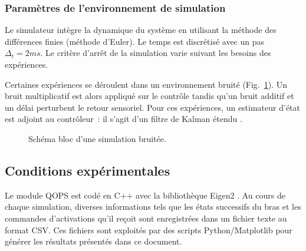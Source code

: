 \documentclass[pdftex,a4paper,11pt]{article}
\begin{document}

\subsubsection{Paramètres de l'environnement de simulation}

Le simulateur intègre la dynamique du système en utilisant la méthode des
différences finies (méthode d'Euler). Le temps est discrétisé avec un pas
$\Delta_t = 2ms$.
Le critère d'arrêt de la simulation varie suivant les besoins des expériences.

Certaines expériences se déroulent dans un environnement bruité (Fig.~\ref{fig:env-loop}).
Un bruit multiplicatif est alors appliqué sur le contrôle tandis qu'un
bruit additif et un délai perturbent le retour sensoriel.
Pour ces expériences, un estimateur
d'état est adjoint au contrôleur~: il s'agit d'un filtre de Kalman étendu
\cite{kalman1960new}.

\begin{figure}[ht]
    \centering
    
    \caption{Schéma bloc d'une simulation bruitée.}
    \label{fig:env-loop}
\end{figure}


%
%
%


%


\subsection{Conditions expérimentales}

Le module QOPS est codé en C++ avec la bibliothèque
Eigen2 \cite{eigen}.
Au cours de chaque simulation, diverses informations tels que les états
successifs du bras et les commandes d'activations qu'il reçoit sont
enregistrées dans un fichier texte au format CSV.
Ces fichiers sont exploités par des scripts Python/Matplotlib pour générer
les résultats présentés dans ce document.
\end{document}
